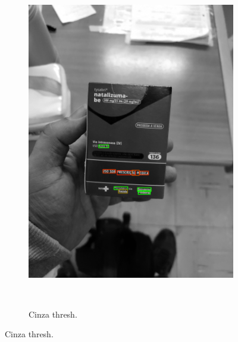 \begin{figure}[htb]
\begin{subfigure}[t]{0.21\textwidth}
        \includegraphics[width=\linewidth]{../pictures/tysabri_rgb_b_only_boxes.jpg}
    \end{subfigure}
    \\\vspace{\floatsep}
    \begin{subfigure}[t]{0.21\textwidth}
        \centering
        \caption{Cinza thresh.}
        \label{fig:foto:versoes:1:Cinza_thresh}

\end{subfigure}
\end{figure}
